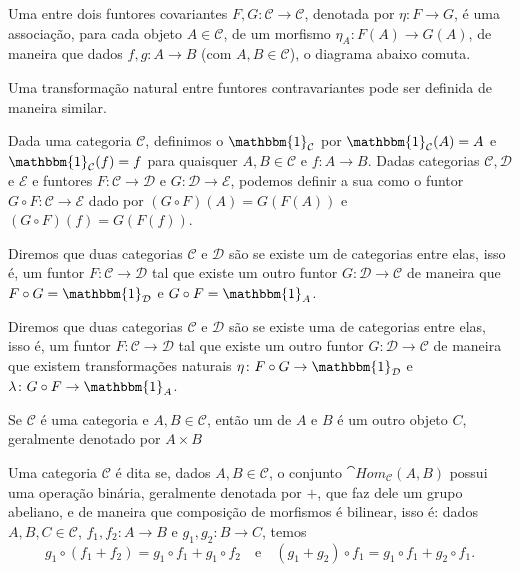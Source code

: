 Uma  entre dois funtores covariantes $F, G \colon \mathcal{C} \to \mathcal{C}$, denotada por $\eta \colon F \to G$, é uma associação, para cada objeto $A \in \mathcal{C}$, de um morfismo $\eta_A \colon F(A) \to G(A)$, de maneira que dados $f, g \colon A \to B$ (com $A, B \in \mathcal{C}$), o diagrama abaixo comuta.
\begin{center}
\end{center}
Uma transformação natural entre funtores contravariantes pode ser definida de maneira similar.

Dada uma categoria $\mathcal{C}$, definimos o  $\mathbbm{1}_\mathcal{C}$ por $\mathbbm{1}_\mathcal{C}(A) = A$ e $\mathbbm{1}_\mathcal{C}(f) = f$ para quaisquer $A, B \in \mathcal{C}$ e $f \colon A \to B$. Dadas categorias $\mathcal{C}, \mathcal{D}$ e $\mathcal{E}$ e funtores $F \colon \mathcal{C} \to \mathcal{D}$ e $G \colon \mathcal{D} \to \mathcal{E}$, podemos definir a sua  como o funtor $G \circ F \colon \mathcal{C} \to \mathcal{E}$ dado por $(G \circ F)(A) = G(F(A))$ e $(G \circ F)(f) = G(F(f))$.

Diremos que duas categorias $\mathcal{C}$ e $\mathcal{D}$ são  se existe um  de categorias entre elas, isso é, um funtor $F \colon \mathcal{C} \to \mathcal{D}$ tal que existe um outro funtor $G \colon \mathcal{D} \to \mathcal{C}$ de maneira que $F \circ G = \mathbbm{1}_\mathcal{D}$ e $G \circ F = \mathbbm{1}_A$.

Diremos que duas categorias $\mathcal{C}$ e $\mathcal{D}$ são  se existe uma  de categorias entre elas, isso é, um funtor $F \colon \mathcal{C} \to \mathcal{D}$ tal que existe um outro funtor $G \colon \mathcal{D} \to \mathcal{C}$ de maneira que existem transformações naturais $\eta \colon F \circ G \to \mathbbm{1}_\mathcal{D}$ e $\lambda \colon G \circ F \to \mathbbm{1}_A$.

Se $\mathcal{C}$ é uma categoria e $A, B \in \mathcal{C}$, então um  de $A$ e $B$ é um outro objeto $C$, geralmente denotado por $A \times B$

Uma categoria $\mathcal{C}$ é dita  se, dados $A, B \in \mathcal{C}$, o conjunto $\cat{Hom}_\mathcal{C}(A,B)$ possui uma operação binária, geralmente denotada por $+$, que faz dele um grupo abeliano, e de maneira que composição de morfismos é bilinear, isso é: dados $A, B, C \in \mathcal{C}$, $f_1, f_2 \colon A \to B$ e $g_1, g_2 \colon B \to C$, temos \begin{equation}
    g_1 \circ (f_1 + f_2) = g_1 \circ f_1 + g_1 \circ f_2 \quad \text{e} \quad (g_1 + g_2) \circ f_1 = g_1 \circ f_1 + g_2 \circ f_1.
\end{equation}

